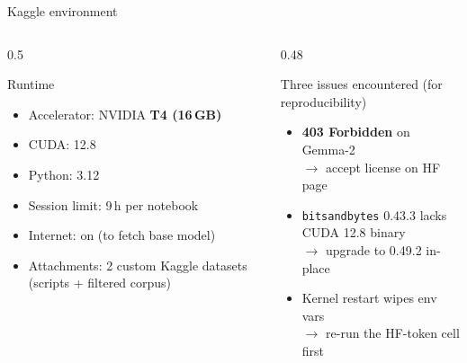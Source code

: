 \documentclass[aspectratio=169, 10pt]{beamer}
\begin{document}
\begin{frame}{Kaggle environment}
  \begin{columns}[T]
    \begin{column}{0.5\textwidth}
      \begin{block}{Runtime}
        \scriptsize
        \begin{itemize}
          \item Accelerator: NVIDIA \textbf{T4 (16\,GB)}
          \item CUDA: 12.8
          \item Python: 3.12
          \item Session limit: 9\,h per notebook
          \item Internet: on (to fetch base model)
          \item Attachments: 2 custom Kaggle datasets
                (scripts + filtered corpus)
        \end{itemize}
      \end{block}
    \end{column}
    \begin{column}{0.48\textwidth}
      \begin{alertblock}{Three issues encountered (for reproducibility)}
        \scriptsize
        \begin{itemize}
          \item \textbf{403 Forbidden} on Gemma-2 \\
                $\to$ accept license on HF page
          \item \texttt{bitsandbytes} 0.43.3 lacks CUDA 12.8 binary \\
                $\to$ upgrade to 0.49.2 in-place
          \item Kernel restart wipes env vars \\
                $\to$ re-run the HF-token cell first
        \end{itemize}
      \end{alertblock}
    \end{column}
  \end{columns}
\end{frame}
\end{document}
